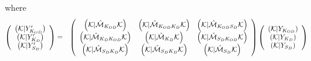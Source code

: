 where 
\begin{eqnarray}
\left( 
\begin{array}{c}
\left( {\cal K}|Y_{K_{OD}}^{\prime }\right) \\ 
\left( {\cal K}|Y_{K_{D}}^{\prime }\right) \\ 
\left( {\cal K}|Y_{S_{D}}^{\prime }\right)%
\end{array}%
\right) &=&\left( 
\begin{array}{ccc}
\left( {\cal K}|{\cal \hat{M}}_{K_{OD}}{\cal K}\right) & \left( {\cal K}|%
{\cal \hat{M}}_{K_{OD}K_{D}}{\cal K}\right) & \left( {\cal K}|{\cal \hat{M}}%
_{K_{OD}S_{D}}{\cal K}\right) \\ 
\left( {\cal K}|{\cal \hat{M}}_{K_{D}K_{OD}}{\cal K}\right) & \left( {\cal K}%
|{\cal \hat{M}}_{K_{D}}{\cal K}\right) & \left( {\cal K}|{\cal \hat{M}}%
_{S_{D}K_{OD}}{\cal K}\right) \\ 
\left( {\cal K}|{\cal \hat{M}}_{S_{D}K_{D}}{\cal K}\right) & \left( {\cal K}|%
{\cal \hat{M}}_{S_{D}K_{D}}{\cal K}\right) & \left( {\cal K}|{\cal \hat{M}}%
_{S_{D}}{\cal K}\right)%
\end{array}%
\right) \left( 
\begin{array}{c}
\left( {\cal K}|Y_{K_{OD}}\right) \\ 
\left( {\cal K}|Y_{K_{D}}\right) \\ 
\left( {\cal K}|Y_{S_{D}}\right)%
\end{array}%
\right)  \nonumber \\
&&
\end{eqnarray}

